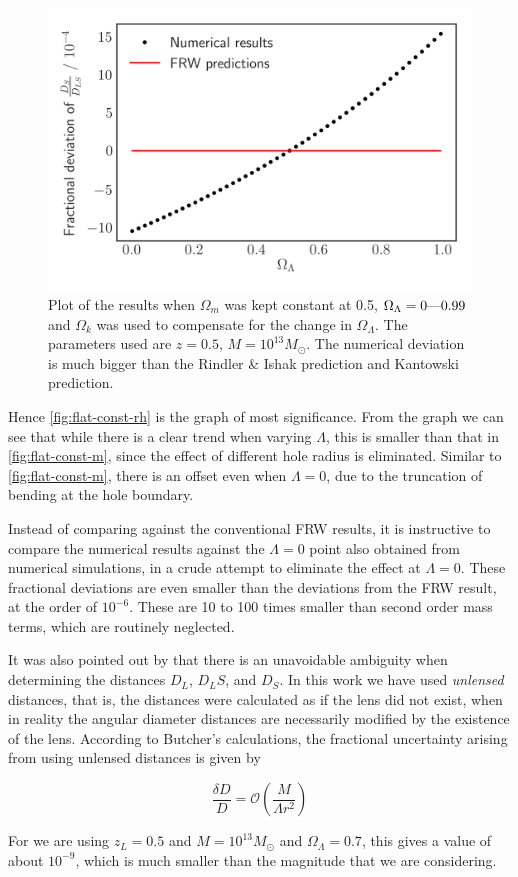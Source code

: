 \begin{figure}
  \centering
  \includegraphics[height=0.5\linewidth]{images/curved.png}
  \caption{Plot of the results when $\Omega_{m}$ was kept constant at 0.5, $\Omega_{\Lambda} = 0\textup{---}0.99$ and $\Omega_k$ was used to compensate for the change in $\Omega_{\Lambda}$. The parameters used are $z = 0.5$, $M = 10^{13} M_{\odot}$. The numerical deviation is much bigger than the Rindler \& Ishak prediction and Kantowski prediction.}
  \label{fig:curved}
\end{figure}

Hence \autoref{fig:flat-const-rh} is the graph of most significance. From the graph we can see that while there is a clear trend when varying $\Lambda$, this is smaller than that in \autoref{fig:flat-const-m}, since the effect of different hole radius is eliminated. Similar to \autoref{fig:flat-const-m}, there is an offset even when $\Lambda = 0$, due to the truncation of bending at the hole boundary. 

Instead of comparing against the conventional FRW results, it is instructive to compare the numerical results against the $\Lambda = 0$ point also obtained from numerical simulations, in a crude attempt to eliminate the effect at $\Lambda = 0$. These fractional deviations are even smaller than the deviations from the FRW result, at the order of $10^{-6}$. These are 10 to 100 times smaller than second order mass terms, which are routinely neglected. 

It was also pointed out by \citet{butcher2016no} that there is an unavoidable ambiguity when determining the distances $D_L$, $D_LS$, and $D_S$. In this work we have used \emph{unlensed} distances, that is, the distances were calculated as if the lens did not exist, when in reality the angular diameter distances are necessarily modified by the existence of the lens. According to Butcher's calculations, the fractional uncertainty arising from using unlensed distances is given by

\begin{equation}
  \frac{\delta D}{D} = \mathcal{O}\left (\frac{M}{\Lambda r^2} \right )
\end{equation}

For we are using $z_L = 0.5$ and $M = 10^{13} M_{\odot}$ and $\Omega_{\Lambda} = 0.7$, this gives a value of about $10^{-9}$, which is much smaller than the magnitude that we are considering. 

